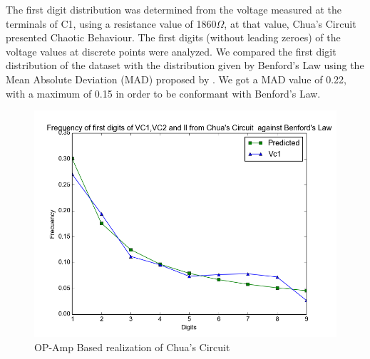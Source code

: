\begin{itemize}
          The first digit distribution was determined from the voltage measured at the terminals of C1, using a resistance value of 1860$\Omega$, at that value, Chua's Circuit presented Chaotic Behaviour. The first digits (without leading zeroes) of the voltage values at discrete points were analyzed. We compared the first digit distribution of the dataset with the distribution given by Benford's Law using the Mean Absolute Deviation (MAD) proposed by \cite{Nigrini97}. We got a MAD value of 0.22, with a maximum of 0.15 in order to be conformant with Benford's Law.
            \begin{figure}[h]
            \centering
            \includegraphics[scale=0.5]{imagenes/2-benford/chua_benford.png}
            \caption{OP-Amp Based realization of Chua's Circuit}
            \end{figure}
 \end{itemize}

\newpage

